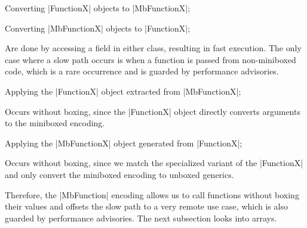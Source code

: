 \begin{compactitem}
  \item Converting |FunctionX| objects to |MbFunctionX|;
  \item Converting |MbFunctionX| objects to |FunctionX|;
  \begin{compactitem}
    \item Are done by accessing a field in either class, resulting in fast execution. The only case where a slow path occurs is when a function is passed from non-miniboxed code, which is a rare occurrence and is guarded by performance advisories.
  \end{compactitem}
  \item Applying the |FunctionX| object extracted from |MbFunctionX|;
  \begin{compactitem}
    \item Occurs without boxing, since the |FunctionX| object directly converts arguments to the miniboxed encoding.
  \end{compactitem}
  \item Applying the |MbFunctionX| object generated from |FunctionX|;
  \begin{compactitem}
    \item Occurs without boxing, since we match the specialized variant of the |FunctionX| and only convert the miniboxed encoding to unboxed generics.
  \end{compactitem}
\end{compactitem}

Therefore, the |MbFunction| encoding allows us to call functions without boxing their values and offsets the slow path to a very remote use case, which is also guarded by performance advisories. The next subsection looks into arrays.

